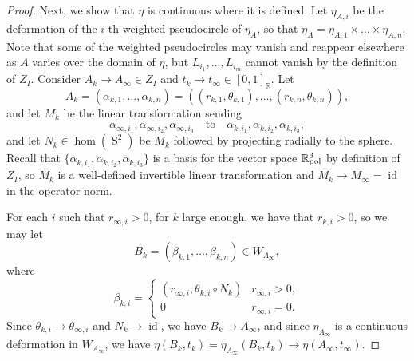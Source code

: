 \documentclass[11pt]{article}
\numberwithin{equation}{section}
\theoremstyle{remark}
\let\mb\mathbb
\DeclareMathOperator{\sphere}{S}
\newcommand{\Rpol}[1]{\mb{R}\mathrlap{{}^{#1}}{}_\text{pol}}
\DeclareMathOperator{\id}{id}
\begin{document}
\begin{proof}
Next, we show that $\eta$ is continuous where it is defined.
Let $\eta_{A,i}$ be the deformation of the $i$-th weighted pseudocircle of $\eta_A$, so that
$\eta_A = {\eta_{A,1} \times \dots \times \eta_{A,n}}$.
Note that some of the weighted pseudocircles may vanish and reappear elsewhere as $A$ varies over the domain of $\eta$, but $L_{i_1},\dots,L_{i_m}$ cannot vanish by the definition of $Z_I$.
Consider $A_k \to A_\infty \in Z_I$ and $t_k \to t_\infty \in [0,1]_\mb{R}$. Let
\[ A_k = (\alpha_{k,1},\dots,\alpha_{k,n}) = ((r_{k,1},\theta_{k,1}),\dots,(r_{k,n},\theta_{k,n})), \]
and let $M_k$ be the linear transformation sending
\[
\alpha_{\infty,i_1},\alpha_{\infty,i_2},\alpha_{\infty,i_3}\quad\text{to}\quad \alpha_{k,i_1},\alpha_{k,i_2},\alpha_{k,i_3},
\]
and let $N_k \in \hom(\sphere^2)$ be $M_k$ followed by projecting radially to the sphere.
Recall that $\{\alpha_{k,i_1},\alpha_{k,i_2},\alpha_{k,i_3}\}$ is a basis for the vector space $\Rpol{3}$ by definition of $Z_I$, so $M_k$ is a well-defined invertible linear transformation and $M_k \to M_\infty=\id$ in the operator norm.

For each $i$ such that $r_{\infty,i} > 0$, for $k$ large enough, we have that $r_{k,i} > 0$, so we may let
\[ B_k = (\beta_{k,1},\dots,\beta_{k,n}) \in W_{A_\infty}, \]
where
\[ \beta_{k,i} = \begin{cases}
(r_{\infty,i},\theta_{k,i} \circ N_k) & r_{\infty,i} > 0, \\
0 & r_{\infty,i} = 0.
\end{cases}\]
Since $\theta_{k,i} \to \theta_{\infty,i}$ and $N_k \to \id$, we have $B_k \to A_\infty$, and since $\eta_{A_\infty}$ is a continuous deformation in $W_{A_\infty}$, we have $\eta(B_k,t_k) = \eta_{A_\infty}(B_k,t_k) \to \eta(A_\infty,t_\infty)$.


\end{proof}
\end{document}
